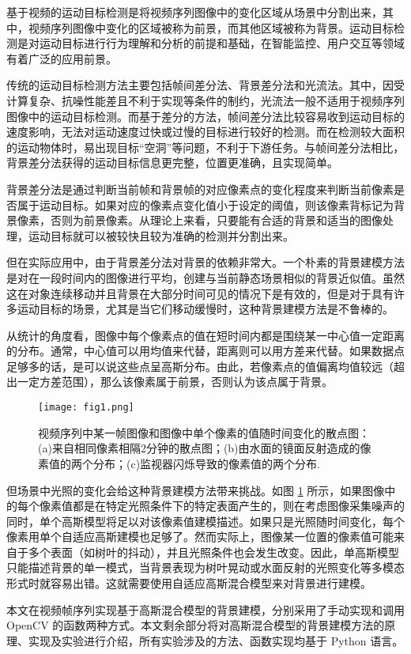 
基于视频的运动目标检测是将视频序列图像中的变化区域从场景中分割出来，其中，视频序列图像中变化的区域被称为前景，而其他区域被称为背景。运动目标检测是对运动目标进行行为理解和分析的前提和基础，在智能监控、用户交互等领域有着广泛的应用前景。

传统的运动目标检测方法主要包括帧间差分法、背景差分法和光流法。其中，因受计算复杂、抗噪性能差且不利于实现等条件的制约，光流法一般不适用于视频序列图像中的运动目标检测。而基于差分的方法，帧间差分法比较容易收到运动目标的速度影响，无法对运动速度过快或过慢的目标进行较好的检测。而在检测较大面积的运动物体时，易出现目标“空洞”等问题，不利于下游任务。与帧间差分法相比，背景差分法获得的运动目标信息更完整，位置更准确，且实现简单。

背景差分法是通过判断当前帧和背景帧的对应像素点的变化程度来判断当前像素是否属于运动目标。如果对应的像素点变化值小于设定的阈值，则该像素背标记为背景像素，否则为前景像素。从理论上来看，只要能有合适的背景和适当的图像处理，运动目标就可以被较快且较为准确的检测并分割出来。

但在实际应用中，由于背景差分法对背景的依赖非常大。一个朴素的背景建模方法是对在一段时间内的图像进行平均，创建与当前静态场景相似的背景近似值。虽然这在对象连续移动并且背景在大部分时间可见的情况下是有效的，但是对于具有许多运动目标的场景，尤其是当它们移动缓慢时，这种背景建模方法是不鲁棒的。

从统计的角度看，图像中每个像素点的值在短时间内都是围绕某一中心值一定距离的分布。通常，中心值可以用均值来代替，距离则可以用方差来代替。如果数据点足够多的话，是可以说这些点呈高斯分布。由此，若像素点的值偏离均值较远（超出一定方差范围），那么该像素属于前景，否则认为该点属于背景。

\begin{figure}[!ht]
  \centering
  \texttt{[image: fig1.png]}
  \caption{视频序列中某一帧图像和图像中单个像素的值随时间变化的散点图：(a)来自相同像素相隔2分钟的散点图；(b)由水面的镜面反射造成的像素值的两个分布；(c)监视器闪烁导致的像素值的两个分布.}
  \label{fig:light_change}
  \vspace{-0.5cm}
\end{figure}

但场景中光照的变化会给这种背景建模方法带来挑战。如图 \ref{fig:light_change} 所示，如果图像中的每个像素值都是在特定光照条件下的特定表面产生的，则在考虑图像采集噪声的同时，单个高斯模型将足以对该像素值建模描述。如果只是光照随时间变化，每个像素用单个自适应高斯建模也足够了。然而实际上，图像某一位置的像素值可能来自于多个表面（如树叶的抖动），并且光照条件也会发生改变。因此，单高斯模型只能描述背景的单一模式，当背景表现为树叶晃动或水面反射的光照变化等多模态形式时就容易出错。这就需要使用自适应高斯混合模型来对背景进行建模。

本文在视频帧序列实现基于高斯混合模型的背景建模，分别采用了手动实现和调用 OpenCV 的函数两种方式。本文剩余部分将对高斯混合模型的背景建模方法的原理、实现及实验进行介绍，所有实验涉及的方法、函数实现均基于 Python 语言。